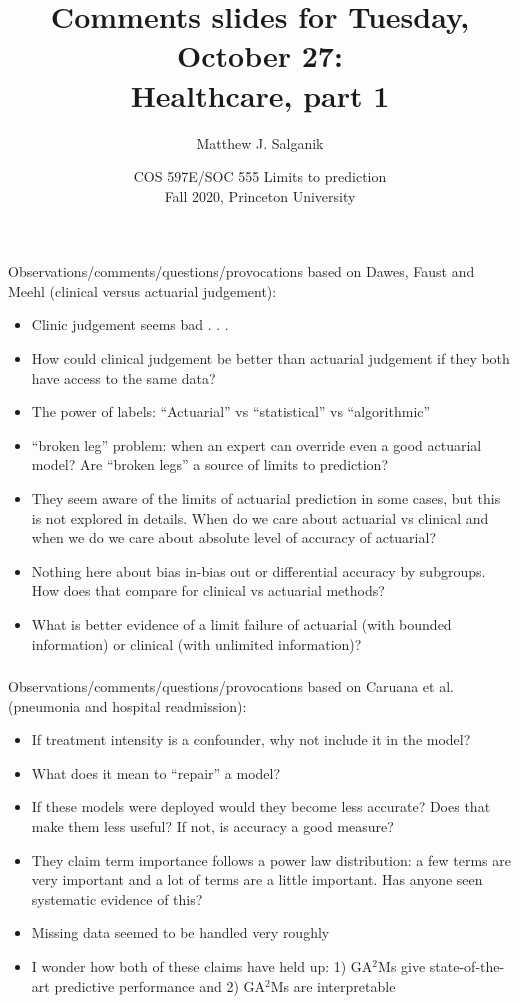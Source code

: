 \documentclass[aspectratio=169]{beamer}
\title[]{Comments slides for Tuesday, October 27:\\Healthcare, part 1}
\author[]{Matthew J. Salganik}
\institute[]{}
\date[]{COS 597E/SOC 555 Limits to prediction\\Fall 2020, Princeton University}
\begin{document}
\frame{\titlepage}
\begin{frame}
\frametitle{}

Observations/comments/questions/provocations based on Dawes, Faust and Meehl (clinical versus actuarial judgement):
\begin{itemize}
\item Clinic judgement seems bad . . .
\pause
\item How could clinical judgement be better than actuarial judgement if they both have access to the same data?
\pause
\item The power of labels: ``Actuarial'' vs ``statistical'' vs ``algorithmic''
\pause
\item ``broken leg'' problem: when an expert can override even a good actuarial model? Are ``broken legs'' a source of limits to prediction?
\pause
\item They seem aware of the limits of actuarial prediction in some cases, but this is not explored in details.  When do we care about actuarial vs clinical and when we do we care about absolute level of accuracy of actuarial?
\pause
\item Nothing here about bias in-bias out or differential accuracy by subgroups.  How does that compare for clinical vs actuarial methods?
\pause
\item What is better evidence of a limit failure of actuarial (with bounded information) or clinical (with unlimited information)? 
\end{itemize}

\end{frame}
\begin{frame}
\frametitle{}

Observations/comments/questions/provocations based on Caruana et al. (pneumonia and hospital readmission):
\begin{itemize}
\item If treatment intensity is a confounder, why not include it in the model? 
\pause
\item What does it mean to ``repair'' a model?
\pause
\item If these models were deployed would they become less accurate? Does that make them less useful? If not, is accuracy a good measure?
\pause
\item They claim term importance follows a power law distribution: a few terms are very important and a lot of terms are a little important. Has anyone seen systematic evidence of this?
\pause
\item Missing data seemed to be handled very roughly 
\pause
\item I wonder how both of these claims have held up: 1) GA$^2$Ms give state-of-the-art predictive performance and 2) GA$^2$Ms are interpretable
\end{itemize}

\end{frame}
\end{document}
